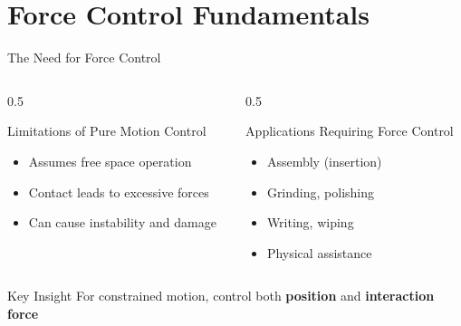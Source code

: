 \documentclass[10pt]{beamer}
\begin{document}
\section{Force Control Fundamentals}
\begin{frame}{The Need for Force Control}
    \begin{columns}
        \begin{column}{0.5\textwidth}
            \begin{alertblock}{Limitations of Pure Motion Control}
                \begin{itemize}
                    \item Assumes free space operation
                    \item Contact leads to excessive forces
                    \item Can cause instability and damage
                \end{itemize}
            \end{alertblock}
        \end{column}
        
        \begin{column}{0.5\textwidth}
            \begin{exampleblock}{Applications Requiring Force Control}
                \begin{itemize}
                    \item Assembly (insertion)
                    \item Grinding, polishing
                    \item Writing, wiping
                    \item Physical assistance
                \end{itemize}
            \end{exampleblock}
        \end{column}
    \end{columns}
    
    \vspace{5mm}
    \begin{center}
    \end{center}
    
    \begin{block}{Key Insight}
        For constrained motion, control both \textbf{position} and \textbf{interaction force}
    \end{block}
\end{frame}
\end{document}
